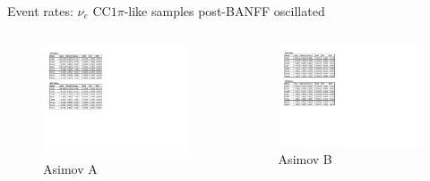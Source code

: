 \documentclass{beamer}
\begin{document}
\begin{frame}{Event rates: $\nu_e\text{ CC}1\pi$-like samples post-BANFF oscillated}
	\centering
	\begin{columns}
		\begin{column}{0.5\paperwidth}
			\begin{figure}
				\includegraphics[page=3, trim={0cm 15cm 13cm 1cm}, clip, scale=0.52] {images/rates/postfit_A}
				\caption{Asimov A}
			\end{figure}
		\end{column}
		\begin{column}{0.5\paperwidth}
			\begin{figure}
				\includegraphics[page=3, trim={0cm 12.75cm 13cm 2.35cm}, clip, scale=0.52] {images/rates/postfit_B}
				\caption{Asimov B}
			\end{figure}
		\end{column}
	\end{columns}
\end{frame}
\end{document}
